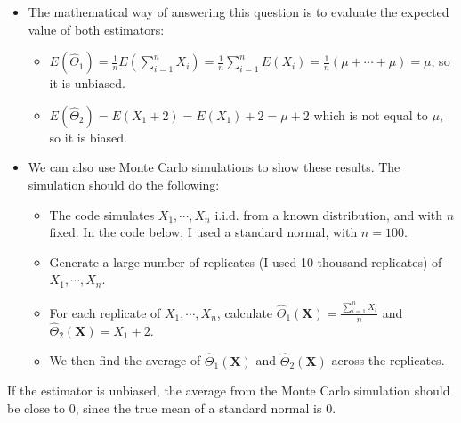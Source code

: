 \documentclass[
]{book}
\providecommand{\tightlist}{%
  \setlength{\itemsep}{0pt}\setlength{\parskip}{0pt}}
\begin{document}
\begin{itemize}
\item
  The mathematical way of answering this question is to evaluate the expected value of both estimators:

  \begin{itemize}
  \item
    \(E(\hat{\Theta}_1) = \frac{1}{n}E(\sum_{i=1}^n X_i) = \frac{1}{n}\sum_{i=1}^n E(X_i) = \frac{1}{n}(\mu + \cdots + \mu) = \mu\), so it is unbiased.
  \item
    \(E(\hat{\Theta}_2)  = E(X_1 + 2) = E(X_1) + 2 = \mu +2\) which is not equal to \(\mu\), so it is biased.
  \end{itemize}
\item
  We can also use Monte Carlo simulations to show these results. The simulation should do the following:

  \begin{itemize}
  \tightlist
  \item
    The code simulates \(X_1, \cdots, X_{n}\) i.i.d. from a known distribution, and with \(n\) fixed. In the code below, I used a standard normal, with \(n=100\).\\
  \item
    Generate a large number of replicates (I used 10 thousand replicates) of \(X_1, \cdots, X_{n}\).
  \item
    For each replicate of \(X_1, \cdots, X_{n}\), calculate \(\hat{\Theta}_1(\boldsymbol{X}) = \frac{\sum_{i=1}^n X_i}{n}\) and \(\hat{\Theta}_2(\boldsymbol{X}) = X_1 + 2\).
  \item
    We then find the average of \(\hat{\Theta}_1(\boldsymbol{X})\) and \(\hat{\Theta}_2(\boldsymbol{X})\) across the replicates.
  \end{itemize}
\end{itemize}

If the estimator is unbiased, the average from the Monte Carlo simulation should be close to 0, since the true mean of a standard normal is 0.
\end{document}
